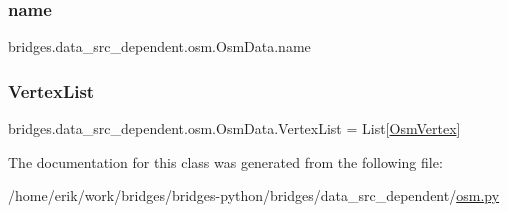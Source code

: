 \subsubsection{\texorpdfstring{name}{name}}
{\footnotesize\ttfamily bridges.\+data\+\_\+src\+\_\+dependent.\+osm.\+Osm\+Data.\+name}

\mbox{\label{classbridges_1_1data__src__dependent_1_1osm_1_1_osm_data_aa2bc633ab0d64a560165a1d55cc1f3a4}} 
\subsubsection{\texorpdfstring{Vertex\+List}{VertexList}}
{\footnotesize\ttfamily bridges.\+data\+\_\+src\+\_\+dependent.\+osm.\+Osm\+Data.\+Vertex\+List = List\mbox{[}\hyperlink{classbridges_1_1data__src__dependent_1_1osm_1_1_osm_vertex}{Osm\+Vertex}\mbox{]}\hspace{0.3cm}{\ttfamily [static]}}



The documentation for this class was generated from the following file\+:\begin{DoxyCompactItemize}
\item 
/home/erik/work/bridges/bridges-\/python/bridges/data\+\_\+src\+\_\+dependent/\hyperlink{osm_8py}{osm.\+py}\end{DoxyCompactItemize}
